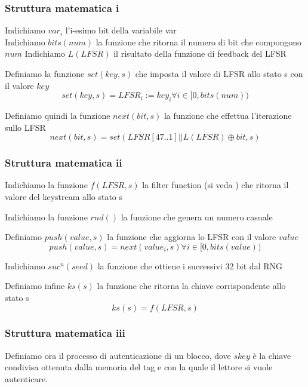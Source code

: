 \begin{frame}
    \frametitle{Struttura matematica i}
    Indichiamo \(var_i\) l'i-esimo bit della variabile var \\
    Indichiamo \(bits(num)\) la funzione che ritorna il numero di bit che compongono \(num\)
    Indichiamo \(L(LFSR)\) il risultato della funzione di feedback del LFSR~\cite{garcia2008dismantling}

    \pause
    Definiamo la funzione \(set(key, s)\) che imposta il valore di LFSR allo stato s con il valore \(key\)
    \[set(key, s) = LFSR_i := key_i \forall i \in [0, bits(num))\]

    \pause
    Definiamo quindi la funzione \(next(bit, s)\) la funzione che effettua l'iterazione sullo LFSR
    \[next(bit, s) = set(LFSR[47..1] || L(LFSR) \oplus bit, s)\]
\end{frame}

\begin{frame}
    \frametitle{Struttura matematica ii}
    Indichiamo la funzione \(f(LFSR, s)\) la filter function (si veda \cite{garcia2008dismantling}) che ritorna il valore del keystream allo stato s

    Indichiamo la funzione \(rnd()\) la funzione che genera un numero casuale

    \pause
    Definiamo \(push(value, s)\) la funzione che aggiorna lo LFSR con il valore \(value\)
    \[push(value, s) = next(value_i, s) \forall i \in [0, bits(value))\]

    \pause
    Indichiamo \(suc^n(seed)\) la funzione che ottiene i successivi 32 bit dal RNG~\cite{secRFIDMutualAuth}

    \pause
    Definiamo infine \(ks(s)\) la funzione che ritorna la chiave corrispondente allo stato s
    \[ks(s) = f(LFSR, s)\]
\end{frame}

\begin{frame}
    \frametitle{Struttura matematica iii}
    Definiamo ora il processo di autenticazione di un blocco, dove \(skey\) è la chiave condivisa ottenuta dalla memoria del tag e con la quale il lettore si vuole autenticare.
\end{frame}

